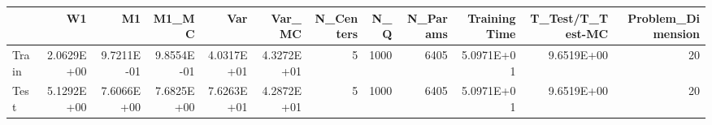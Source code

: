 \begin{tabular}{lrrrrrrrrrrr}
\toprule
{} &         W1 &         M1 &      M1\_MC &        Var &     Var\_MC &  N\_Centers &   N\_Q &  N\_Params &  Training Time &  T\_Test/T\_Test-MC &  Problem\_Dimension \\
\midrule
Train & 2.0629E+00 & 9.7211E-01 & 9.8554E-01 & 4.0317E+01 & 4.3272E+01 &          5 &  1000 &      6405 &     5.0971E+01 &        9.6519E+00 &                 20 \\
Test  & 5.1292E+00 & 7.6066E+00 & 7.6825E+00 & 7.6263E+01 & 4.2872E+01 &          5 &  1000 &      6405 &     5.0971E+01 &        9.6519E+00 &                 20 \\
\bottomrule
\end{tabular}
